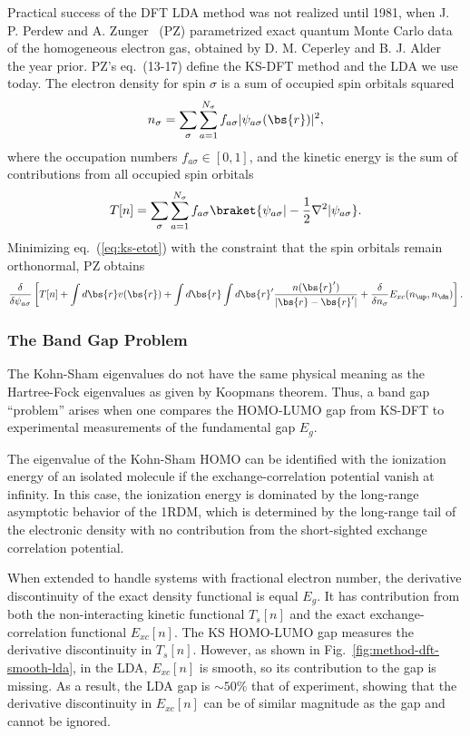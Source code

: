 Practical success of the DFT LDA method was not realized until 1981, when J. P. Perdew and A. Zunger~\cite{Perdew1981} (PZ) parametrized exact quantum Monte Carlo data of the homogeneous electron gas, obtained by D. M. Ceperley and B. J. Alder~\cite{Ceperley1980} the year prior. PZ's eq.~(13-17) define the KS-DFT method and the LDA we use today. The electron density for spin $\sigma$ is a sum of occupied spin orbitals squared
\begin{align}
n_{\sigma} = \sum\limits_{\sigma}\sum\limits_{a=1}^{N_{\sigma}}
f_{a\sigma} \vert\psi_{a\sigma}(\bs{r})\vert^2,
\end{align}
where the occupation numbers $f_{a\sigma}\in[0, 1]$, and the kinetic energy is the sum of contributions from all occupied spin orbitals
\begin{align}
T[n] = \sum\limits_\sigma\sum\limits_{a=1}^{N_{\sigma}}
f_{a\sigma} \braket{\psi_{a\sigma}|-\frac{1}{2}\nabla^2|\psi_{a\sigma}}.
\end{align}
Minimizing eq.~(\ref{eq:ks-etot}) with the constraint that the spin orbitals remain orthonormal, PZ obtains
\begin{align}
\dfrac{\delta}{\delta\psi_{a\sigma}} \left[
T[n] + \int d\bs{r}v(\bs{r}) + \int d\bs{r}\int d\bs{r}' \dfrac{n(\bs{r}')}{\vert\bs{r}-\bs{r}'\vert} +
\dfrac{\delta}{\delta n_{\sigma}} E_{xc}(n_{\up},n_{\dn})
\right].
\end{align}

\subsubsection{The Band Gap Problem} \label{sec:method-dft-bandgap}
The Kohn-Sham eigenvalues do not have the same physical meaning as the Hartree-Fock eigenvalues as given by Koopmans theorem. Thus, a band gap ``problem'' arises when one compares the HOMO-LUMO gap from KS-DFT to experimental measurements of the fundamental gap $E_g$.

The eigenvalue of the Kohn-Sham HOMO can be identified with the ionization energy of an isolated molecule if the exchange-correlation potential vanish at infinity.
In this case, the ionization energy is dominated by the long-range asymptotic behavior of the 1RDM, which is determined by the long-range tail of the electronic density with no contribution from the short-sighted exchange correlation potential.

When extended to handle systems with fractional electron number, the derivative discontinuity of the exact density functional is equal $E_g$. It has contribution from both the non-interacting kinetic functional $T_s[n]$ and the exact exchange-correlation functional $E_{xc}[n]$. The KS HOMO-LUMO gap measures the derivative discontinuity in $T_s[n]$. However, as shown in Fig.~\ref{fig:method-dft-smooth-lda}, in the LDA, $E_{xc}[n]$ is smooth, so its contribution to the gap is missing. As a result, the LDA gap is $\sim 50\%$ that of experiment, showing that the derivative discontinuity in $E_{xc}[n]$ can be of similar magnitude as the gap and cannot be ignored.

